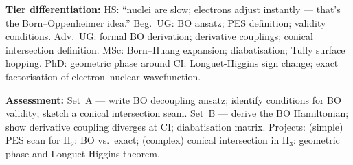 \documentclass[11pt,a4paper]{article}
\begin{document}
\begin{tcolorbox}[chembox, title={Module~III.1 / L02: Born--Oppenheimer Approximation and Adiabaticity}]
\medskip\textbf{Tier differentiation:}
HS: ``nuclei are slow; electrons adjust instantly --- that's the Born--Oppenheimer idea.''
Beg.\ UG: BO ansatz; PES definition; validity conditions.
Adv.\ UG: formal BO derivation; derivative couplings; conical intersection definition.
MSc: Born--Huang expansion; diabatisation; Tully surface hopping.
PhD: geometric phase around CI; Longuet-Higgins sign change; exact factorisation of electron--nuclear wavefunction.

\medskip\textbf{Assessment:}
Set~A --- write BO decoupling ansatz; identify conditions for BO validity; sketch a conical intersection seam.
Set~B --- derive the BO Hamiltonian; show derivative coupling diverges at CI; diabatisation matrix.
Projects: (simple) PES scan for H$_2$: BO vs.\ exact; (complex) conical intersection in H$_3$: geometric phase and Longuet-Higgins theorem.
\end{tcolorbox}

\medskip
\end{document}

